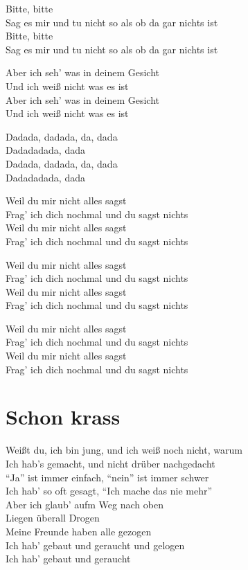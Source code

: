 \documentclass[]{book}
\begin{document}
Bitte, bitte\\
Sag es mir und tu nicht so als ob da gar nichts ist\\
Bitte, bitte\\
Sag es mir und tu nicht so als ob da gar nichts ist

Aber ich seh' was in deinem Gesicht\\
Und ich weiß nicht was es ist\\
Aber ich seh' was in deinem Gesicht\\
Und ich weiß nicht was es ist

Dadada, dadada, da, dada\\
Dadadadada, dada\\
Dadada, dadada, da, dada\\
Dadadadada, dada

Weil du mir nicht alles sagst\\
Frag' ich dich nochmal und du sagst nichts\\
Weil du mir nicht alles sagst\\
Frag' ich dich nochmal und du sagst nichts

Weil du mir nicht alles sagst\\
Frag' ich dich nochmal und du sagst nichts\\
Weil du mir nicht alles sagst\\
Frag' ich dich nochmal und du sagst nichts

Weil du mir nicht alles sagst\\
Frag' ich dich nochmal und du sagst nichts\\
Weil du mir nicht alles sagst\\
Frag' ich dich nochmal und du sagst nichts

\hypertarget{schon-krass}{%
\section{Schon krass}\label{schon-krass}}

Weißt du, ich bin jung, und ich weiß noch nicht, warum\\
Ich hab's gemacht, und nicht drüber nachgedacht\\
``Ja'' ist immer einfach, ``nein'' ist immer schwer\\
Ich hab' so oft gesagt, ``Ich mache das nie mehr''\\
Aber ich glaub' aufm Weg nach oben\\
Liegen überall Drogen\\
Meine Freunde haben alle gezogen\\
Ich hab' gebaut und geraucht und gelogen\\
Ich hab' gebaut und geraucht
\end{document}

